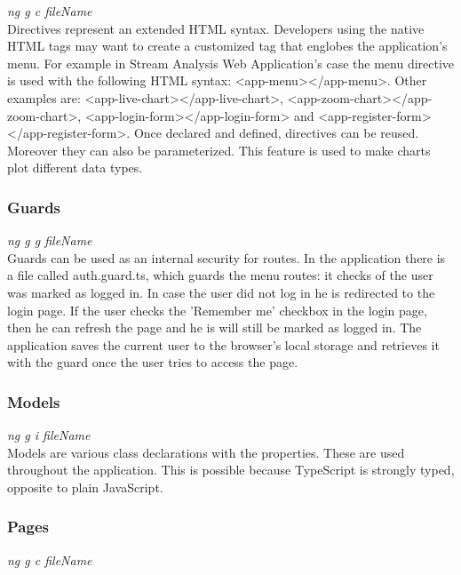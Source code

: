 \textit{ng g c fileName}\\

Directives represent an extended HTML syntax. Developers using the native HTML tags may want to create a customized tag that englobes the application's menu. For example in Stream Analysis Web Application's case the menu directive is used with the following HTML syntax: <app-menu></app-menu>. Other examples are: <app-live-chart></app-live-chart>, <app-zoom-chart></app-zoom-chart>, <app-login-form></app-login-form> and <app-register-form></app-register-form>. Once declared and defined, directives can be reused. Moreover they can also be parameterized. This feature is used to make charts plot different data types.

\subsubsection{Guards}
\label{chap:04:01:02:02}

\textit{ng g g fileName}\\

Guards can be used as an internal security for routes. In the application there is a file called auth.guard.ts, which guards the menu routes: it checks of the user was marked as logged in. In case the user did not log in he is redirected to the login page. If the user checks the 'Remember me' checkbox in the login page, then he can refresh the page and he is will still be marked as logged in. The application saves the current user to the browser's local storage and retrieves it with the guard once the user tries to access the page.

\subsubsection{Models}
\label{chap:04:01:02:03}

\textit{ng g i fileName}\\

Models are various class declarations with the properties. These are used throughout the application. This is possible because TypeScript is strongly typed, opposite to plain JavaScript.

\subsubsection{Pages}
\label{chap:04:01:02:04}

\textit{ng g c fileName}\\

